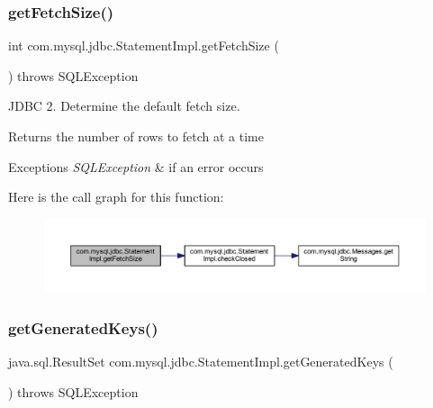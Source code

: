 \subsubsection{\texorpdfstring{get\+Fetch\+Size()}{getFetchSize()}}
{\footnotesize\ttfamily int com.\+mysql.\+jdbc.\+Statement\+Impl.\+get\+Fetch\+Size (\begin{DoxyParamCaption}{ }\end{DoxyParamCaption}) throws S\+Q\+L\+Exception}

J\+D\+BC 2. Determine the default fetch size.

\begin{DoxyReturn}{Returns}
the number of rows to fetch at a time
\end{DoxyReturn}

\begin{DoxyExceptions}{Exceptions}
{\em S\+Q\+L\+Exception} & if an error occurs \\
\hline
\end{DoxyExceptions}
Here is the call graph for this function\+:
\nopagebreak
\begin{figure}[H]
\begin{center}
\leavevmode
\includegraphics[width=350pt]{classcom_1_1mysql_1_1jdbc_1_1_statement_impl_a1f4c39edc88b50042869f5bc19828059_cgraph}
\end{center}
\end{figure}
\mbox{\label{classcom_1_1mysql_1_1jdbc_1_1_statement_impl_a9c52b991cceda77bcab92b5e23026c23}} 
\subsubsection{\texorpdfstring{get\+Generated\+Keys()}{getGeneratedKeys()}}
{\footnotesize\ttfamily java.\+sql.\+Result\+Set com.\+mysql.\+jdbc.\+Statement\+Impl.\+get\+Generated\+Keys (\begin{DoxyParamCaption}{ }\end{DoxyParamCaption}) throws S\+Q\+L\+Exception}


